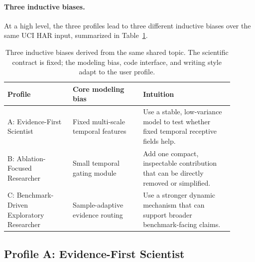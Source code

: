 \documentclass{opendatalab}
\begin{document}
\paragraph{Three inductive biases.}
At a high level, the three profiles lead to three different inductive
biases over the same UCI HAR input, summarized in
Table~\ref{tab:case-study-bias}.

\begin{table}[h]
\centering
\small
\begin{tabular}{p{0.26\linewidth} p{0.28\linewidth} p{0.36\linewidth}}
\toprule
\textbf{Profile} & \textbf{Core modeling bias} & \textbf{Intuition} \\
\midrule
A: Evidence-First Scientist &
Fixed multi-scale temporal features &
Use a stable, low-variance model to test whether fixed temporal
receptive fields help. \\
B: Ablation-Focused Researcher &
Small temporal gating module &
Add one compact, inspectable contribution that can be directly removed or
simplified. \\
C: Benchmark-Driven Exploratory Researcher &
Sample-adaptive evidence routing &
Use a stronger dynamic mechanism that can support broader benchmark-facing
claims. \\
\bottomrule
\end{tabular}
\caption{Three inductive biases derived from the same shared topic. The
scientific contract is fixed; the modeling bias, code interface, and
writing style adapt to the user profile.}
\label{tab:case-study-bias}
\end{table}

\subsection{Profile A: Evidence-First Scientist}
\label{app:case-study:profile-a}
\end{document}

